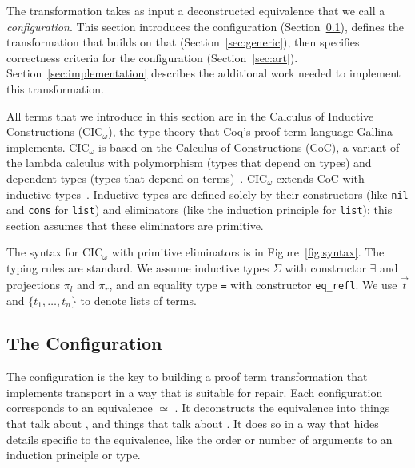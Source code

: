 
The transformation takes as input a deconstructed equivalence that we call a \textit{configuration}.
This section introduces the configuration (Section~\ref{sec:configurable}),
defines the transformation that builds on that (Section~\ref{sec:generic}),
then specifies correctness criteria for the configuration (Section~\ref{sec:art}).
Section~\ref{sec:implementation} describes the additional work needed to implement this transformation.

All terms that we introduce in this section are in the Calculus of Inductive Constructions (CIC$_{\omega}$), the type theory
that Coq's proof term language Gallina implements.
CIC$_{\omega}$ is based on the Calculus of Constructions (CoC), a variant of the lambda calculus with polymorphism (types that depend on types) and dependent types (types that depend on terms)~\cite{coquand:inria-00076024}. CIC$_{\omega}$ extends CoC with
inductive types~\cite{inductive}.
Inductive types are defined solely by their constructors (like \lstinline{nil} and \lstinline{cons} for \lstinline{list}) and eliminators (like the induction principle for \lstinline{list}); this section assumes that these eliminators are primitive.

The syntax for CIC$_{\omega}$ with primitive eliminators is in Figure~\ref{fig:syntax}.
The typing rules are standard.
We assume inductive types $\Sigma$ with constructor $\exists$ and projections $\pi_l$ and $\pi_r$,
and an equality type \lstinline{=} with constructor \lstinline{eq_refl}.
We use $\vec{t}$ and $\{t_1, \ldots, t_n\}$ to denote lists of terms.

\subsection{The Configuration}
\label{sec:configurable}

The configuration is the key to building a proof term transformation that implements transport in a way that is suitable for repair.
Each configuration corresponds to an equivalence \A $\simeq$ \B.
It deconstructs the equivalence into things that talk about \A, and things that talk about \B.
It does so in a way that hides details
specific to the equivalence, like the order or number of arguments to an induction principle or type.

